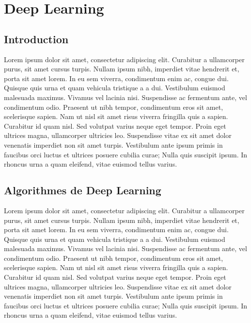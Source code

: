 \chapter{Deep Learning}
\section{Introduction}
Lorem ipsum dolor sit amet, consectetur adipiscing elit. Curabitur a ullamcorper purus, sit amet cursus turpis. Nullam ipsum nibh, imperdiet vitae hendrerit et, porta sit amet lorem. In eu sem viverra, condimentum enim ac, congue dui. Quisque quis urna et quam vehicula tristique a a dui. Vestibulum euismod malesuada maximus. Vivamus vel lacinia nisi. Suspendisse ac fermentum ante, vel condimentum odio. Praesent ut nibh tempor, condimentum eros sit amet, scelerisque sapien. Nam ut nisl sit amet risus viverra fringilla quis a sapien. Curabitur id quam nisl. Sed volutpat varius neque eget tempor. Proin eget ultrices magna, ullamcorper ultricies leo. Suspendisse vitae ex sit amet dolor venenatis imperdiet non sit amet turpis. Vestibulum ante ipsum primis in faucibus orci luctus et ultrices posuere cubilia curae; Nulla quis suscipit ipsum. In rhoncus urna a quam eleifend, vitae euismod tellus varius.

\section{Algorithmes de Deep Learning}
Lorem ipsum dolor sit amet, consectetur adipiscing elit. Curabitur a ullamcorper purus, sit amet cursus turpis. Nullam ipsum nibh, imperdiet vitae hendrerit et, porta sit amet lorem. In eu sem viverra, condimentum enim ac, congue dui. Quisque quis urna et quam vehicula tristique a a dui. Vestibulum euismod malesuada maximus. Vivamus vel lacinia nisi. Suspendisse ac fermentum ante, vel condimentum odio. Praesent ut nibh tempor, condimentum eros sit amet, scelerisque sapien. Nam ut nisl sit amet risus viverra fringilla quis a sapien. Curabitur id quam nisl. Sed volutpat varius neque eget tempor. Proin eget ultrices magna, ullamcorper ultricies leo. Suspendisse vitae ex sit amet dolor venenatis imperdiet non sit amet turpis. Vestibulum ante ipsum primis in faucibus orci luctus et ultrices posuere cubilia curae; Nulla quis suscipit ipsum. In rhoncus urna a quam eleifend, vitae euismod tellus varius.

